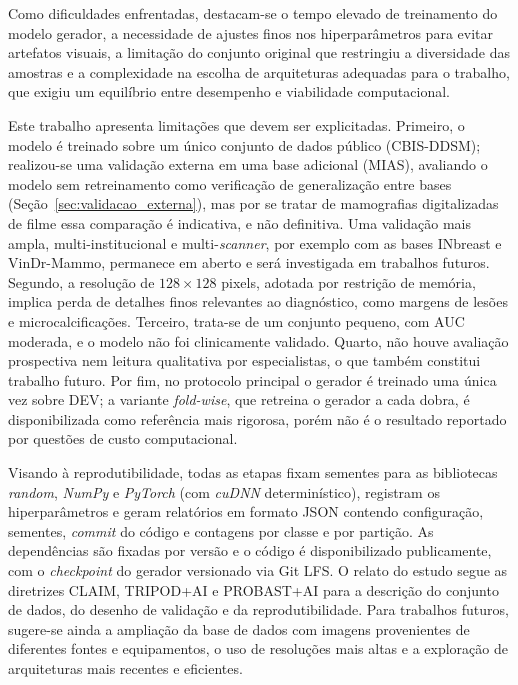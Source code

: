\documentclass[
	12pt,				%
	openright,			%
	oneside,			%
	a4paper,			%
	tcc,			%
	]{ABNT-DC-UEL}
\begin{document}
Como dificuldades enfrentadas, destacam-se o tempo elevado de treinamento do modelo gerador, a necessidade de ajustes finos nos hiperparâmetros para evitar artefatos visuais, a limitação do conjunto original que restringiu a diversidade das amostras e a complexidade na escolha de arquiteturas adequadas para o trabalho, que exigiu um equilíbrio entre desempenho e viabilidade computacional.

Este trabalho apresenta limitações que devem ser explicitadas. Primeiro, o modelo é treinado sobre um único conjunto de dados público (CBIS-DDSM); realizou-se uma validação externa em uma base adicional (MIAS), avaliando o modelo sem retreinamento como verificação de generalização entre bases (Seção~\ref{sec:validacao_externa}), mas por se tratar de mamografias digitalizadas de filme essa comparação é indicativa, e não definitiva. Uma validação mais ampla, multi-institucional e multi-\textit{scanner}, por exemplo com as bases INbreast e VinDr-Mammo, permanece em aberto e será investigada em trabalhos futuros. Segundo, a resolução de $128 \times 128$ pixels, adotada por restrição de memória, implica perda de detalhes finos relevantes ao diagnóstico, como margens de lesões e microcalcificações. Terceiro, trata-se de um conjunto pequeno, com AUC moderada, e o modelo não foi clinicamente validado. Quarto, não houve avaliação prospectiva nem leitura qualitativa por especialistas, o que também constitui trabalho futuro. Por fim, no protocolo principal o gerador é treinado uma única vez sobre DEV; a variante \textit{fold-wise}, que retreina o gerador a cada dobra, é disponibilizada como referência mais rigorosa, porém não é o resultado reportado por questões de custo computacional.

Visando à reprodutibilidade, todas as etapas fixam sementes para as bibliotecas \textit{random}, \textit{NumPy} e \textit{PyTorch} (com \textit{cuDNN} determinístico), registram os hiperparâmetros e geram relatórios em formato JSON contendo configuração, sementes, \textit{commit} do código e contagens por classe e por partição. As dependências são fixadas por versão e o código é disponibilizado publicamente, com o \textit{checkpoint} do gerador versionado via Git LFS. O relato do estudo segue as diretrizes CLAIM, TRIPOD+AI e PROBAST+AI \cite{mongan2020claim,collins2024tripodai,moons2024probastai} para a descrição do conjunto de dados, do desenho de validação e da reprodutibilidade. Para trabalhos futuros, sugere-se ainda a ampliação da base de dados com imagens provenientes de diferentes fontes e equipamentos, o uso de resoluções mais altas e a exploração de arquiteturas mais recentes e eficientes.

\postextual



\end{document}
